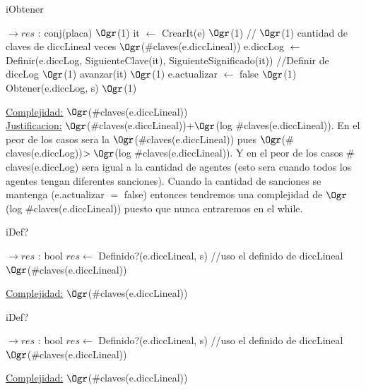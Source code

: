 \begin{Representacion}
\begin{Algoritmos}
	\begin{algorithm}[H]
		\caption{iObtener}
		\begin{algorithmic}[1]
			 $\to res$ : conj(placa)
			 \Comment $\Ogr$(1)
				\State it $\leftarrow$ CrearIt(e) \Comment $\Ogr$(1)
				 // $\Ogr$(1) cantidad de claves de diccLineal veces \Comment $\Ogr$($\#$claves(e.diccLineal))
					\State e.diccLog $\leftarrow$ Definir(e.diccLog, SiguienteClave(it), SiguienteSignificado(it)) //Definir de diccLog \Comment $\Ogr$(1) 
					\State avanzar(it) \Comment $\Ogr$(1) 
				\EndWhile
				\State e.actualizar $\leftarrow$ false \Comment $\Ogr$(1) 
			\EndIf
			\State Obtener(e.diccLog, s) $\Ogr$(1)
			\EndProcedure
		\end{algorithmic}
		\underline{Complejidad:} $\Ogr$($\#$claves(e.diccLineal))
		\\
		\underline{Justificacion:} $\Ogr$($\#$claves(e.diccLineal))+$\Ogr$(log $\#$claves(e.diccLineal)). En el peor de los casos sera la $\Ogr$($\#$claves(e.diccLineal)) pues $\Ogr$($\#$claves(e.diccLog))$>\Ogr$(log $\#$claves(e.diccLineal)). Y en el peor de los casos $\#$claves(e.diccLog) sera igual a la cantidad de agentes (esto sera cuando todos los agentes tengan diferentes sanciones). Cuando la cantidad de sanciones se mantenga (e.actualizar $=$ false) entonces tendremos una complejidad de $\Ogr$(log $\#$claves(e.diccLineal)) puesto que nunca entraremos en el while.
	\end{algorithm}	
	
	\begin{algorithm}[H]
		\caption{iDef?}
		
		\begin{algorithmic}[1]
			 $\to res$ : bool
			\State $res \leftarrow$ Definido?(e.diccLineal, s) //uso el definido de diccLineal \Comment $\Ogr$($\#$claves(e.diccLineal))
			\EndProcedure
		\end{algorithmic}
		\underline{Complejidad:} $\Ogr$($\#$claves(e.diccLineal))
		
	\end{algorithm}
	
	\begin{algorithm}[H]
		\caption{iDef?}
		
		\begin{algorithmic}[1]
			 $\to res$ : bool
			\State $res \leftarrow$ Definido?(e.diccLineal, s) //uso el definido de diccLineal \Comment $\Ogr$($\#$claves(e.diccLineal))
			\EndProcedure
		\end{algorithmic}
		\underline{Complejidad:} $\Ogr$($\#$claves(e.diccLineal))
		

\end{algorithm}
\end{Algoritmos}
\end{Representacion}
